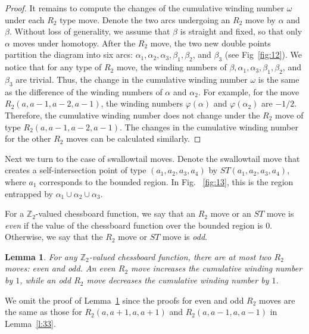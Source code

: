 \documentclass[12pt]{amsart}
\def \Z{\mathbb{Z}}
\newtheorem{lemma}[theorem]{Lemma}
\theoremstyle{definition}
\begin{document}
{\begin{proof}
 
 It remains to compute the changes of the cumulative winding number $\omega$ under each $R_2$ type  move.  Denote the two arcs undergoing an $R_2$ move by $\alpha$ and $\beta$.  Without loss of generality,  we assume that $\beta$ is straight and fixed, so that only $\alpha$ moves under homotopy.  After the $R_2$ move,  the two new double points partition the diagram into six arcs: $\alpha_1 ,  \alpha_2 , \alpha_3 , \beta_1 , \beta_2$,  and $\beta_3$ (see Fig~\ref{fig:12}).   We notice that for any type of $R_2$ move,  the winding numbers of $\beta, \alpha_1 , \alpha_3 , \beta_1 , \beta_2$,  and $\beta_3$ are trivial.  Thus, the change in the cumulative winding number $\omega$ is the same as the difference of the winding numbers of $\alpha$ and $\alpha_2$. For example, for the move $R_2(a, a-1, a-2, a-1)$, the winding numbers $\varphi(\alpha)$ and $\varphi(\alpha_2)$ are $-1/2$. Therefore, the cumulative winding number does not change under the $R_2$ move of type $R_2(a, a-1, a-2, a-1)$. The changes in the cumulative winding number for the other $R_2$ moves can be calculated similarly. 
 \end{proof}
 
 Next we turn to the case of swallowtail moves.
 Denote the swallowtail move that creates a self-intersection point of type $(a_1,a_2,a_3,a_4)$ by $ST(a_1,a_2,a_3,a_4)$,  where  $a_1$ corresponds to the bounded region. In Fig. ~\ref{fig:13}, this is the region entrapped by $\alpha_1 \cup \alpha_2 \cup \alpha_3$.  

 For a $\Z_2$-valued chessboard function, we say that an $R_2$ move or an $ST$ move is \emph{even} if the value of the chessboard function over the bounded region is $0$. Otherwise, we say that the $R_2$ move or  $ST$ move is \emph{odd}. 

 \begin{lemma}\label{l:33a} For any $\Z_2$-valued chessboard function, there are at most two $R_2$ moves: even and odd.  An even $R_2$ move increases the cumulative winding number by $1$, while an odd $R_2$ move decreases the cumulative winding number by $1$.  
 \end{lemma}
 
 We omit the proof of Lemma~\ref{l:33a} since the proofs for even and odd $R_2$ moves are the same as those for $R_2(a, a+1, a, a+1)$ and $R_2(a, a-1, a, a-1)$ in  Lemma~\ref{l:33}.
 
}
\end{document}
